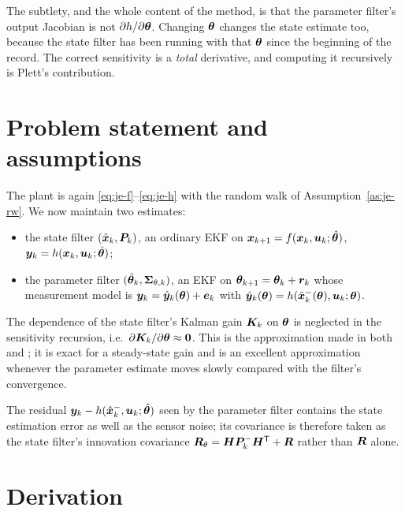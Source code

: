 The subtlety, and the whole content of the method, is that the parameter filter's output Jacobian is
not $\partial h/\partial\bm{\theta}$.  Changing $\bm{\theta}$ changes the state estimate too, because the
state filter has been running with that $\bm{\theta}$ since the beginning of the record.  The correct
sensitivity is a \emph{total} derivative, and computing it recursively is Plett's contribution.

\section{Problem statement and assumptions}
The plant is again \eqref{eq:je-f}--\eqref{eq:je-h} with the random walk of
Assumption~\ref{as:je-rw}.  We now maintain two estimates:
\begin{itemize}[nosep]
\item the state filter $(\hat{\bm{x}}_k,\bm{P}_k)$, an ordinary EKF on
      $\bm{x}_{k+1}=f(\bm{x}_k,\bm{u}_k;\hat{\bm{\theta}})$, $\bm{y}_k=h(\bm{x}_k,\bm{u}_k;\hat{\bm{\theta}})$;
\item the parameter filter $(\hat{\bm{\theta}}_k,\bm{\Sigma}_{\theta,k})$, an EKF on
      $\bm{\theta}_{k+1}=\bm{\theta}_k+\bm{r}_k$ whose measurement model is
      $\bm{y}_k=\hat{\bm{y}}_k(\bm{\theta})+\bm{e}_k$ with
      $\hat{\bm{y}}_k(\bm{\theta})=h(\hat{\bm{x}}^{-}_k(\bm{\theta}),\bm{u}_k;\bm{\theta})$.
\end{itemize}

\begin{assumption}\label{as:de-gain}
The dependence of the state filter's Kalman gain $\bm{K}_k$ on $\bm{\theta}$ is neglected in the
sensitivity recursion, i.e.\ $\partial\bm{K}_k/\partial\bm{\theta}\approx\bm{0}$.  This is the
approximation made in both \cite{plett2004ekf3} and \cite{wannelson2001dual}; it is exact for a
steady-state gain and is an excellent approximation whenever the parameter estimate moves slowly
compared with the filter's convergence.
\end{assumption}

\begin{assumption}\label{as:de-R}
The residual $\bm{y}_k-h(\hat{\bm{x}}^{-}_k,\bm{u}_k;\hat{\bm{\theta}})$ seen by the parameter filter contains the
state estimation error as well as the sensor noise; its covariance is therefore taken as the state
filter's innovation covariance $\bm{R}_\theta=\bm{H}\bm{P}^-_k\bm{H}^{\mathsf{T}}+\bm{R}$ rather than $\bm{R}$ alone.
\end{assumption}

\section{Derivation}

